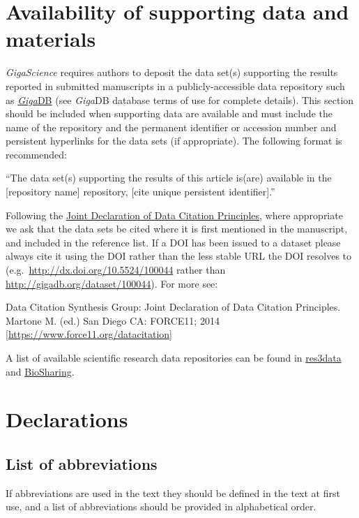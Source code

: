 \documentclass[a4paper,num-refs]{oup-contemporary}
\begin{document}
\section{Availability of supporting data and materials}

\textit{GigaScience} requires authors to deposit the data set(s) supporting the results reported in submitted manuscripts in a publicly-accessible data repository such as \href{http://gigadb.org/}{\textit{Giga}DB} (see \textit{Giga}DB database terms of use for complete details). This section should be included when supporting data are available and must include the name of the repository and the permanent identifier or accession number and persistent hyperlinks for the data sets (if appropriate). The following format is recommended:

``The data set(s) supporting the results of this article is(are) available in the [repository name] repository, [cite unique persistent identifier].''

Following the \href{https://www.force11.org/group/joint-declaration-data-citation-principles-final}{Joint Declaration of Data Citation Principles}, where appropriate we ask that the data sets be cited where it is first mentioned in the manuscript, and included in the reference list. If a DOI has been issued to a dataset please always cite it using the DOI rather than the less stable URL the DOI resolves to (e.g.~\url{http://dx.doi.org/10.5524/100044} rather than \url{http://gigadb.org/dataset/100044}). For more see:

Data Citation Synthesis Group: Joint Declaration of Data Citation Principles. Martone M. (ed.) San Diego CA: FORCE11; 2014 [\url{https://www.force11.org/datacitation}]

A list of available scientific research data repositories can be found in \href{http://www.re3data.org/}{res3data} and \href{https://biosharing.org/}{BioSharing}.

\section{Declarations}

\subsection{List of abbreviations}
If abbreviations are used in the text they should be defined in the text at first use, and a list of abbreviations should be provided in alphabetical order.
\end{document}
